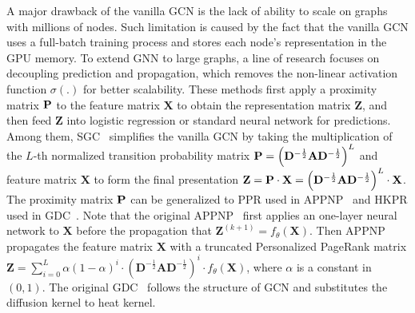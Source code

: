 A major drawback of the vanilla GCN is the lack of ability to scale on graphs with millions of nodes. Such limitation is caused by the fact that the vanilla GCN uses a full-batch training process and stores each node's representation in the GPU memory. 
To extend GNN to large graphs, a line of research focuses on decoupling prediction and propagation, which removes the non-linear activation function $\sigma(.)$ for better scalability. These methods first apply a proximity matrix $\P$ to the feature matrix $\mathbf{X}$ to obtain the representation matrix $\mathbf{Z}$, and then feed $\mathbf{Z}$ into logistic regression or standard neural network for predictions. 
Among them, SGC~\cite{wu2019SGC} simplifies the vanilla GCN by taking the multiplication of the $L$-th normalized transition probability matrix $\P=\left(\mathbf{D}^{-\frac{1}{2}}\mathbf{A} \mathbf{D}^{-\frac{1}{2}} \right)^L$ and feature matrix  $\mathbf{X}$ to form the final presentation $\mathbf{Z}=\P\cdot \X=\left(\mathbf{D}^{-\frac{1}{2}}\mathbf{A} \mathbf{D}^{-\frac{1}{2}} \right)^L \cdot \X$.  %
The proximity matrix $\P$ can be generalized to PPR used in APPNP~\cite{Klicpera2018APPNP} and HKPR used in GDC~\cite{klicpera2019GDC}. Note that the original APPNP~\cite{Klicpera2018APPNP} first applies an one-layer neural network to $\mathbf{X}$ before the propagation that $\mathbf{Z}^{(k+1)}=f_\theta(\mathbf{X})$. Then APPNP propagates the feature matrix $\mathbf{X}$ with a truncated Personalized PageRank matrix $\mathbf{Z} =\sum_{i=0}^L \alpha \left( 1-\alpha \right)^i \cdot \left(\mathbf{D}^{-\frac{1}{2}}\mathbf{A} \mathbf{D}^{-\frac{1}{2}} \right)^i \cdot f_\theta(\mathbf{X})$, where $\alpha$ is a constant in $(0,1)$. The original GDC~\cite{klicpera2019GDC} follows the structure of GCN and substitutes the diffusion kernel to heat kernel. 
